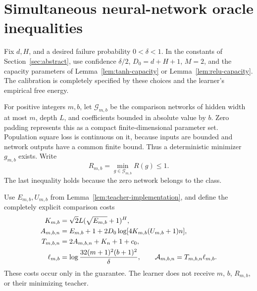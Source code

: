 \section{Simultaneous neural-network oracle inequalities}
\label{sec:network-corollaries}
Fix $d,H$, and a desired failure probability $0<\delta<1$. In the constants of Section~\ref{sec:abstract}, use confidence $\delta/2$, $D_0=d+H+1$, $M=2$, and the capacity parameters of Lemma~\ref{lem:tanh-capacity} or Lemma~\ref{lem:relu-capacity}. The calibration is completely specified by these choices and the learner's empirical free energy.

For positive integers $m,b$, let $\mathcal G_{m,b}$ be the comparison networks of hidden width at most $m$, depth $L$, and coefficients bounded in absolute value by $b$. Zero padding represents this as a compact finite-dimensional parameter set. Population square loss is continuous on it, because inputs are bounded and network outputs have a common finite bound. Thus a deterministic minimizer $g_{m,b}$ exists. Write
\[
 R_{m,b}=\min_{g\in\mathcal G_{m,b}}R(g)\le1.
\]
The last inequality holds because the zero network belongs to the class.

Use $E_{m,b},U_{m,b}$ from Lemma~\ref{lem:teacher-implementation}, and define the completely explicit comparison costs
\begin{align}
 K_{m,b}&=\sqrt2L(\sqrt{E_{m,b}}+1)^H,\notag\\
 A_{m,b,n}&=E_{m,b}+1+2D_0\log[4K_{m,b}(U_{m,b}+1)n],\notag\\
 T_{m,b,n}&=2A_{m,b,n}+K_n+1+c_0,\label{eq:simultaneous-cost}\\
 \ell_{m,b}&=\log\frac{32(m+1)^2(b+1)^2}\delta,\qquad
 \mathcal A_{m,b,n}=T_{m,b,n}\ell_{m,b}.\notag
\end{align}
These costs occur only in the guarantee. The learner does not receive $m$, $b$, $R_{m,b}$, or their minimizing teacher.

